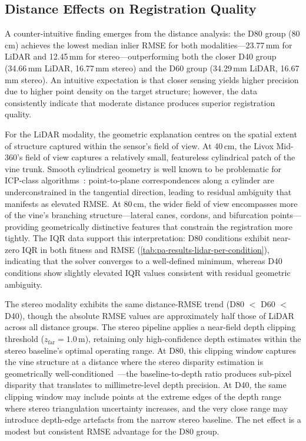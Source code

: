 \subsection{Distance Effects on Registration Quality}
\label{subsec:pa-discussion-distance}

A counter-intuitive finding emerges from the distance analysis: the D80 group (80\,cm) achieves the lowest median inlier RMSE for both modalities---23.77\,mm for LiDAR and 12.45\,mm for stereo---outperforming both the closer D40 group (34.66\,mm LiDAR, 16.77\,mm stereo) and the D60 group (34.29\,mm LiDAR, 16.67\,mm stereo). An intuitive expectation is that closer sensing yields higher precision due to higher point density on the target structure; however, the data consistently indicate that moderate distance produces superior registration quality.

For the LiDAR modality, the geometric explanation centres on the spatial extent of structure captured within the sensor's field of view. At 40\,cm, the Livox Mid-360's field of view captures a relatively small, featureless cylindrical patch of the vine trunk. Smooth cylindrical geometry is well known to be problematic for ICP-class algorithms~\cite{rusinkiewiczEfficientVariantsICP2001}: point-to-plane correspondences along a cylinder are underconstrained in the tangential direction, leading to residual ambiguity that manifests as elevated RMSE. At 80\,cm, the wider field of view encompasses more of the vine's branching structure---lateral canes, cordons, and bifurcation points---providing geometrically distinctive features that constrain the registration more tightly. The IQR data support this interpretation: D80 conditions exhibit near-zero IQR in both fitness and RMSE (\cref{tab:pa-results-lidar-per-condition}), indicating that the solver converges to a well-defined minimum, whereas D40 conditions show slightly elevated IQR values consistent with residual geometric ambiguity.

The stereo modality exhibits the same distance-RMSE trend (D80 $<$ D60 $<$ D40), though the absolute RMSE values are approximately half those of LiDAR across all distance groups. The stereo pipeline applies a near-field depth clipping threshold ($z_\text{far} = 1.0$\,m), retaining only high-confidence depth estimates within the stereo baseline's optimal operating range. At D80, this clipping window captures the vine structure at a distance where the stereo disparity estimation is geometrically well-conditioned~\cite{wenFoundationStereoZeroShot2025}---the baseline-to-depth ratio produces sub-pixel disparity that translates to millimetre-level depth precision. At D40, the same clipping window may include points at the extreme edges of the depth range where stereo triangulation uncertainty increases, and the very close range may introduce depth-edge artefacts from the narrow stereo baseline. The net effect is a modest but consistent RMSE advantage for the D80 group.


